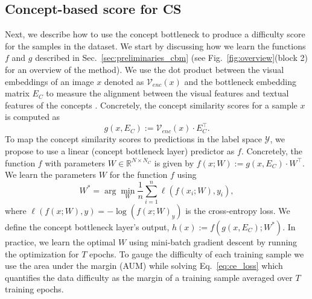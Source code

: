 


\subsection{Concept-based score for CS}
\label{sec:concept_score_based_CS}
Next, we describe how to use the concept bottleneck to produce a difficulty score for the samples in the dataset. %
We start by discussing how we learn the functions $f$ and $g$ described in Sec.~\ref{sec:preliminaries_cbm}
(see Fig.~\ref{fig:overview}(block 2) for an overview of the method).
We use the dot product between the visual embeddings of an image $x$ denoted as $\mathcal{V}_{enc}(x)$ and the bottleneck embedding matrix $E_C$ to measure the alignment between the visual features and textual features of the concepts \cite{yang2023language,yan2023learning}. Concretely, 
the concept similarity scores for a sample $x$ is computed as 
\begin{equation}
\label{eq:concept_similarity}
g(x, E_C) := \mathcal{V}_{enc}(x) \cdot E_C^\intercal. 
\end{equation}
To map the concept similarity scores to predictions in the label space $\mathcal{Y}$, we propose to use a linear (concept bottleneck layer) predictor as $f$.
Concretely, the function $f$ with parameters $W \in \mathbb{R}^{N \times N_C}$ is given by
\(f(x; W) := g(x, E_C) \cdot W^\intercal\). 
We learn the parameters $W$ for the function $f$ using %
\begin{equation}
\label{eq:ce_loss}
W^* = \arg \min_{W} \frac{1}{n} \sum_{i=1}^{n} \ell(f(x_i; W), y_i), %
\end{equation}
where $\ell(f(x; W), y) = -\log(f(x; W)_y)$ is the cross-entropy loss.
We define the concept bottleneck layer's output, $h(x):=f(g(x, E_C); W^*).$ %
In practice, we learn the optimal $W$ using mini-batch gradient descent by running the optimization for $T$ epochs.
To gauge the difficulty of each training sample we use the area under the margin (AUM) \cite{pleiss2020identifying} while solving Eq.~\ref{eq:ce_loss} which quantifies the data difficulty as the margin of a training sample averaged over $T$ training epochs.  
